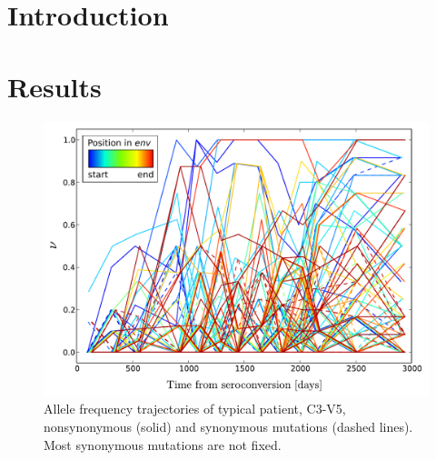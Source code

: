\documentclass[12pt,a4paper,notitlepage,onecolumn]{article}
\title{\Title}
\author{\Author}
\date{\today}
\begin{document}
\maketitle

\begin{abstract}
\noindent
Intrapatient HIV evolution is goverened by selection on the protein level in the
arms race with the immune system (killer T-cells and antibodies). Synonymous
mutations do not have an immunity-related phenotype and are often assumed to be
neutral. In this paper, we show that synonymous changes in epitope-rich regions
are often deleterious but still reach frequencies of order one.  We analyze time
series of viral sequences from the V1-C5 part of {\it env} within individual
hosts and observe that synonymous derived alleles rarely fix in the
viral population. Simulations suggest that such synonymous mutations
have a (Malthisuan) selection coefficient of the order of $-0.001$, and that
they are brought up to high frequency by linkage to neighbouring beneficial
nonsynonymous alleles (genetic draft). As far as the biological causes are
concerned, we detect a negative correlation between fixation of an allele and
its involvement in evolutionarily conserved RNA stem-loop structures.
This phenonenon is not observed in other parts of the HIV genome, in which
selective sweeps are less dense and the genetic architecture less constrained.
\end{abstract}

\section{Introduction}
\section{Results}

\begin{figure}
\begin{center}
\includegraphics[width=\linewidth]{Shankarappa_allele_freqs_trajectories_syn_nonsynp8}
\caption{Allele frequency trajectories of typical patient, C3-V5, nonsynonymous
(solid) and synonymous mutations (dashed lines). Most synonymous mutations are
not fixed.}
\end{center}
\end{figure}
\end{document}
